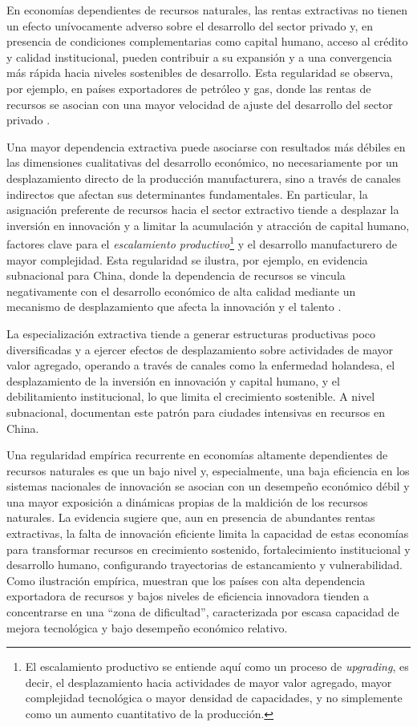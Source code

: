 \documentclass[../../TFM.tex]{subfiles}
\begin{document}
	En economías dependientes de recursos naturales, las rentas extractivas no tienen un efecto unívocamente adverso sobre el desarrollo del sector privado y, en presencia de condiciones complementarias como capital humano, acceso al crédito y calidad institucional, pueden contribuir a su expansión y a una convergencia más rápida hacia niveles sostenibles de desarrollo. Esta regularidad se observa, por ejemplo, en países exportadores de petróleo y gas, donde las rentas de recursos se asocian con una mayor velocidad de ajuste del desarrollo del sector privado \textcite{Muhamad2020}.
	
	Una mayor dependencia extractiva puede asociarse con resultados más débiles en las dimensiones cualitativas del desarrollo económico, no necesariamente por un desplazamiento directo de la producción manufacturera, sino a través de canales indirectos que afectan sus determinantes fundamentales. En particular, la asignación preferente de recursos hacia el sector extractivo tiende a desplazar la inversión en innovación y a limitar la acumulación y atracción de capital humano, factores clave para el \textit{escalamiento productivo}\footnote{El escalamiento productivo se entiende aquí como un proceso de \textit{upgrading}, es decir, el desplazamiento hacia actividades de mayor valor agregado, mayor complejidad tecnológica o mayor densidad de capacidades, y no simplemente como un aumento cuantitativo de la producción.} y el desarrollo manufacturero de mayor complejidad. Esta regularidad se ilustra, por ejemplo, en evidencia subnacional para China, donde la dependencia de recursos se vincula negativamente con el desarrollo económico de alta calidad mediante un mecanismo de desplazamiento que afecta la innovación y el talento \textcite{Du2020}.
	
	La especialización extractiva tiende a generar estructuras productivas poco diversificadas y a ejercer efectos de desplazamiento sobre actividades de mayor valor agregado, operando a través de canales como la enfermedad holandesa, el desplazamiento de la inversión en innovación y capital humano, y el debilitamiento institucional, lo que limita el crecimiento sostenible. A nivel subnacional, \textcite{Lu2019} documentan este patrón para ciudades intensivas en recursos en China.
	
	Una regularidad empírica recurrente en economías altamente dependientes de recursos naturales es que un bajo nivel y, especialmente, una baja eficiencia en los sistemas nacionales de innovación se asocian con un desempeño económico débil y una mayor exposición a dinámicas propias de la maldición de los recursos naturales. La evidencia sugiere que, aun en presencia de abundantes rentas extractivas, la falta de innovación eficiente limita la capacidad de estas economías para transformar recursos en crecimiento sostenido, fortalecimiento institucional y desarrollo humano, configurando trayectorias de estancamiento y vulnerabilidad. Como ilustración empírica, \textcite{Namazi2018} muestran que los países con alta dependencia exportadora de recursos y bajos niveles de eficiencia innovadora tienden a concentrarse en una “zona de dificultad”, caracterizada por escasa capacidad de mejora tecnológica y bajo desempeño económico relativo.
	
\end{document}

